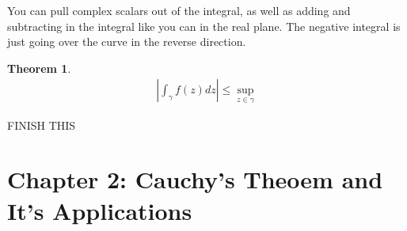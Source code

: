 \documentclass[12pt]{article}
\newtheorem{theorem}{Theorem}
\begin{document}
You can pull complex scalars out of the integral, as well as adding and subtracting in the integral like you can in the real plane. 
The negative integral is just going over the curve in the reverse direction. 

\begin{theorem}
  \begin{align*}
    |\int_{\gamma} f(z) dz | \leq \sup_{z \in \gamma}
  \end{align*}
\end{theorem}

FINISH THIS

\section*{Chapter 2: Cauchy's Theoem and It's Applications}
\end{document}
